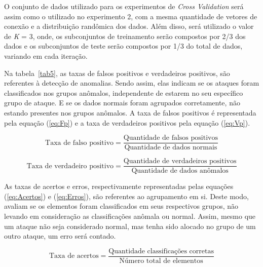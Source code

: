 \indent O conjunto de dados utilizado para os experimentos de \textit{Cross Validation} será assim como o utilizado no experimento 2, com a mesma quantidade de vetores de conexão e a distribuição randômica dos dados. Além disso, será utilizado o valor de \textit{K} = 3, onde, os subconjuntos de treinamento serão compostos por 2/3 dos dados e os subconjuntos de teste serão compostos por 1/3 do total de dados, variando em cada iteração.

\indent Na tabela~\ref{tab5}, as taxas de falsos positivos e verdadeiros positivos, são referentes à detecção de anomalias. Sendo assim, elas indicam se os ataques foram classificados nos grupos anômalos, independente de estarem no seu específico grupo de ataque. E se os dados normais foram agrupados corretamente, não estando presentes nos grupos anômalos. A taxa de falsos positivos é representada pela equação (\ref{eq:Fp}) e a taxa de verdadeiros positivos pela equação (\ref{eq:Vp}).

\vspace{0.3cm}
\begin{equation}
\label{eq:Fp} %
\textrm{Taxa de falso positivo} = \frac{\textrm{Quantidade de falsos positivos}}{\textrm{Quantidade de dados normais}}
\end{equation}
\vspace{0cm}

\vspace{0cm}
\begin{equation}
\label{eq:Vp} %
\textrm{Taxa de verdadeiro positivo}  = \frac{\textrm{Quantidade de verdadeiros positivos}}{\textrm{Quantidade de dados anômalos}}
\end{equation}
\vspace{0.3cm}

\indent As taxas de acertos e erros, respectivamente representadas pelas equações (\ref{eq:Acertos}) e (\ref{eq:Erros}), são referentes ao agrupamento em si. Deste modo, avaliam se os elementos foram classificados em seus respectivos grupos, não levando em consideração as classificações anômala ou normal. Assim, mesmo que um ataque não seja considerado normal, mas tenha sido alocado no grupo de um outro ataque, um erro será contado.

\vspace{0.3cm}
\begin{equation}
\label{eq:Acertos} %
\textrm{Taxa de acertos} = \frac{\textrm{Quantidade classificações corretas}}{\textrm{Número total de elementos}}
\end{equation}
\vspace{0cm}

